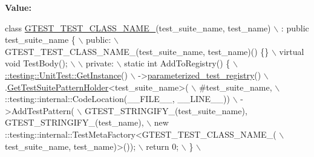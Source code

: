 {\bfseries Value\+:}
\begin{DoxyCode}
\textcolor{keyword}{class }\hyperlink{gtest-internal_8h_ad4bc4ec847a06e7de981e81c9bb116cf}{GTEST\_TEST\_CLASS\_NAME\_}(test\_suite\_name, test\_name)                     \(\backslash\)
      : \textcolor{keyword}{public} test\_suite\_name \{                                               \(\backslash\)
   public:                                                                     \(\backslash\)
    GTEST\_TEST\_CLASS\_NAME\_(test\_suite\_name, test\_name)() \{\}                    \(\backslash\)
    virtual \textcolor{keywordtype}{void} TestBody();                                                   \(\backslash\)
                                                                               \(\backslash\)
   private:                                                                    \(\backslash\)
    static \textcolor{keywordtype}{int} AddToRegistry() \{                                               \hyperlink{classtesting_1_1UnitTest_af254e2e695471eb9f128bc556bae3668}{\(\backslash\)}
\hyperlink{classtesting_1_1UnitTest_af254e2e695471eb9f128bc556bae3668}{      ::testing::UnitTest::GetInstance}()                             
                \(\backslash\)
          ->\hyperlink{classtesting_1_1UnitTest_a3f72b753a9eda20bf7ab2aef0bdcc40f}{parameterized\_test\_registry}()                                      \(\backslash\)
          .\hyperlink{classtesting_1_1internal_1_1ParameterizedTestSuiteRegistry_a89ef6dd228f4188e1928513e860580d0}{GetTestSuitePatternHolder}<test\_suite\_name>(                         \(\backslash\)
\textcolor{preprocessor}{              #test\_suite\_name,                                                \(\backslash\)}
\textcolor{preprocessor}{              ::testing::internal::CodeLocation(\_\_FILE\_\_, \_\_LINE\_\_))           \(\backslash\)}
\textcolor{preprocessor}{          ->AddTestPattern(                                                    \(\backslash\)}
\textcolor{preprocessor}{              GTEST\_STRINGIFY\_(test\_suite\_name), GTEST\_STRINGIFY\_(test\_name),  \(\backslash\)}
\textcolor{preprocessor}{              new ::testing::internal::TestMetaFactory<GTEST\_TEST\_CLASS\_NAME\_( \(\backslash\)}
\textcolor{preprocessor}{                  test\_suite\_name, test\_name)>());                             \(\backslash\)}
\textcolor{preprocessor}{      return 0;                                                                \(\backslash\)}
\textcolor{preprocessor}{    \}                                                                          \(\backslash\)}

\end{DoxyCode}
